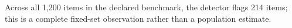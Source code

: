 Across all 1,200 items in the declared benchmark, the detector flags 214 items; this is a complete fixed-set observation rather than a population estimate.
